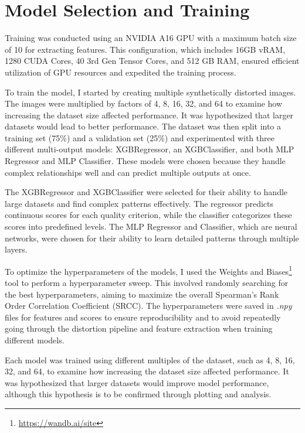 \section{Model Selection and Training}
\label{sec:ModelTraining}
Training was conducted using an NVIDIA A16 GPU with a maximum batch size of 10 for extracting features. This configuration, which includes 16GB vRAM, 1280 CUDA Cores, 40 3rd Gen Tensor Cores, and 512 GB RAM, ensured efficient utilization of GPU resources and expedited the training process. \par
\vspace{\baselineskip}
\noindent
To train the model, I started by creating multiple synthetically distorted images. The images were multiplied by factors of 4, 8, 16, 32, and 64 to examine how increasing the dataset size affected performance. It was hypothesized that larger datasets would lead to better performance. The dataset was then split into a training set (75\%) and a validation set (25\%) and experimented with three different multi-output models: XGBRegressor, an XGBClassifier, and both MLP Regressor and MLP Classifier. These models were chosen because they handle complex relationships well and can predict multiple outputs at once.\par
\vspace{\baselineskip}
\noindent
The XGBRegressor and XGBClassifier were selected for their ability to handle large datasets and find complex patterns effectively. The regressor predicts continuous scores for each quality criterion, while the classifier categorizes these scores into predefined levels. The MLP Regressor and Classifier, which are neural networks, were chosen for their ability to learn detailed patterns through multiple layers. \par
\vspace{\baselineskip}
\noindent
To optimize the hyperparameters of the models, I used the Weights and Biases\footnote{\url{https://wandb.ai/site}} tool to perform a hyperparameter sweep. This involved randomly searching for the best hyperparameters, aiming to maximize the overall Spearman’s Rank Order Correlation Coefficient (SRCC). The hyperparameters were saved in \textit{.npy} files for features and scores to ensure reproducibility and to avoid repeatedly going through the distortion pipeline and feature extraction when training different models. \par
\vspace{\baselineskip}
\noindent
Each model was trained using different multiples of the dataset, such as 4, 8, 16, 32, and 64, to examine how increasing the dataset size affected performance. It was hypothesized that larger datasets would improve model performance, although this hypothesis is to be confirmed through plotting and analysis. \par
